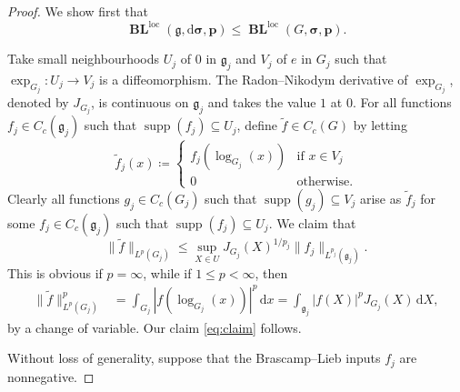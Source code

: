 \documentclass[12pt,twoside,a4paper]{amsart}
\theoremstyle{definition}
\theoremstyle{remark}
\numberwithin{equation}{section}
\newcommand{\Lie}[1]{\mathfrak{#1}}
\newcommand{\supp}{\operatorname{supp}}
\newcommand{\loc}{\mathrm{loc}}
\newcommand{\wrt}[1]{\,\mathrm{d} #1}
\newcommand{\BL}{\operatorname{\mathbf{BL}}}
\newcommand{\bss}{\boldsymbol{\sigma}}
\newcommand{\bsDs}{\boldsymbol{\mathrm{d}\sigma}}
\newcommand{\bsp}{\boldsymbol{p}}
\newcommand{\labs}{\left\vert}
\newcommand{\rabs}{\right\vert}
\begin{document}
\begin{proof}
We show first that
\[
\BL^{\loc}(\Lie{g},\bsDs ,\bsp)\leq \BL^{\loc}(G,\bss ,\bsp) .
\]

Take small neighbourhoods $U_j$ of $0$ in $\Lie{g}_j$ and $V_j$ of $e$ in $G_j$ such that $\exp_{G_j} \colon U_j \to V_j $ is a diffeomorphism.
The Radon--Nikodym derivative of $\exp_{G_j}$,  denoted by $J_{G_j}$, is continuous on $\Lie{g}_j$ and takes the value $1$ at $0$.
For all functions $f_j \in C_c(\Lie{g}_j)$ such that $\supp(f_j) \subseteq U_j$, define $\tilde{f} \in C_c(G) $ by letting 
\begin{equation}\label{eq:def-approx-fn}
\tilde f_j(x)\coloneqq  
\begin{cases}
f_j (\log_{G_j} (x))  & \text{if $x \in V_j$} \\
0                      & \text{otherwise}.  
\end{cases}
\end{equation}
Clearly all functions $g_j \in C_c(G_j)$ such that $\supp(g_j) \subseteq V_j$ arise as $\tilde f_j$ for some $f_j \in C_c(\Lie{g}_j)$ such that $\supp(f_j) \subseteq U_j$. 
We claim that 
\begin{equation}\label{eq:claim}
\| \tilde{f} \|_{L^p({G_j})} 
\leq \sup_{X \in U} J_{G_j}(X)^{1/p_j} \| f_j \|_{L^{p_j} (\Lie{g}_j)}.
\end{equation}
This is obvious if $p=\infty$, while if $1\leq p<\infty$, then
\begin{align*}
\| \tilde {f} \|^p_{L^p({G_j})}
&=\int_{G_j} \labs  f(\log_{G_j} (x)) \rabs ^p\wrt x
=\int_{\Lie{g}_j}  \labs f(X) \rabs ^p J_{G_j}(X)\wrt X,
\end{align*}
by a change of variable.
Our claim \eqref{eq:claim} follows.

Without loss of generality, suppose  that the Brascamp--Lieb inputs $f_j$ are nonnegative.


\end{proof}
\end{document}
